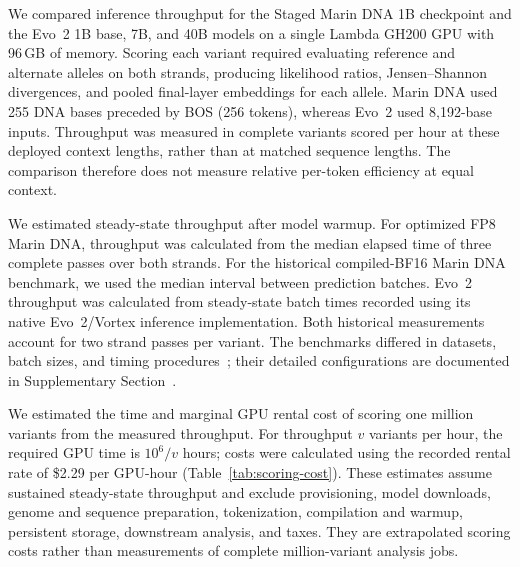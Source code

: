 \documentclass[a4paper,num-refs]{oup-contemporary}
\begin{document}
We compared inference throughput for the Staged Marin DNA 1B
checkpoint and the Evo~2 1B base, 7B, and 40B models on a single
Lambda GH200 GPU with 96\,GB of memory.
Scoring each variant required evaluating reference and alternate
alleles on both strands, producing likelihood ratios,
Jensen--Shannon divergences, and pooled final-layer embeddings
for each allele.
Marin DNA used 255 DNA bases preceded by BOS (256 tokens), whereas
Evo~2 used 8,192-base inputs.
Throughput was measured in complete variants scored per hour at
these deployed context lengths, rather than at matched sequence
lengths. The comparison therefore does not measure relative
per-token efficiency at equal context.

We estimated steady-state throughput after model warmup.
For optimized FP8 Marin DNA, throughput was calculated from the
median elapsed time of three complete passes over both strands.
For the historical compiled-BF16 Marin DNA benchmark, we used
the median interval between prediction batches.
Evo~2 throughput was calculated from steady-state batch times
recorded using its native Evo~2/Vortex inference implementation.
Both historical measurements account for two strand passes per
variant.
The benchmarks differed in datasets, batch sizes, and timing
procedures~\citep{marindna131,marindna354,marindna430};
their detailed configurations are documented in Supplementary
Section~.

We estimated the time and marginal GPU rental cost of scoring
one million variants from the measured throughput.
For throughput $v$ variants per hour, the required GPU time is
$10^6/v$ hours; costs were calculated using the recorded rental
rate of \$2.29 per GPU-hour (Table~\ref{tab:scoring-cost}).
These estimates assume sustained steady-state throughput and
exclude provisioning, model downloads, genome and sequence
preparation, tokenization, compilation and warmup, persistent
storage, downstream analysis, and taxes.
They are extrapolated scoring costs rather than measurements
of complete million-variant analysis jobs.
\end{document}
